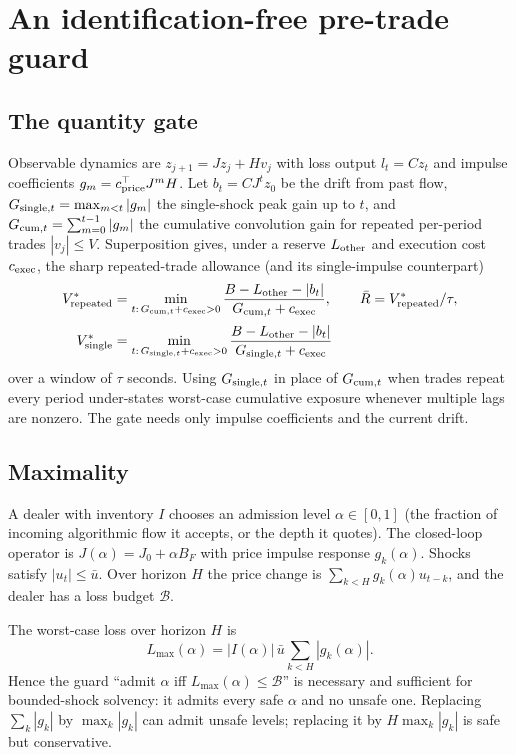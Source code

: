 \section{An identification-free pre-trade guard}\label{sec:guard}

\subsection{The quantity gate}
Observable dynamics are $z_{j+1}=Jz_j+Hv_j$ with loss output $l_t=Cz_t$ and impulse coefficients $g_m=c^\top_{\rm price}J^mH$. Let $b_t=CJ^tz_0$ be the drift from past flow, $G_{{\rm single},t}=\max_{m<t}|g_m|$ the single-shock peak gain up to $t$, and $G_{{\rm cum},t}=\sum_{m=0}^{t-1}|g_m|$ the cumulative convolution gain for repeated per-period trades $|v_j|\le V$. Superposition gives, under a reserve $L_{\rm other}$ and execution cost $c_{\rm exec}$, the sharp repeated-trade allowance (and its single-impulse counterpart)
\begin{equation}\label{eq:gate}
\begin{aligned}
V^*_{\rm repeated} &= \min_{t:\,G_{{\rm cum},t}+c_{\rm exec}>0}\frac{B-L_{\rm other}-|b_t|}{G_{{\rm cum},t}+c_{\rm exec}}, \qquad\bar R=V^*_{\rm repeated}/\tau, \\[2pt]
V^*_{\rm single} &= \min_{t:\,G_{{\rm single},t}+c_{\rm exec}>0}\frac{B-L_{\rm other}-|b_t|}{G_{{\rm single},t}+c_{\rm exec}}
\end{aligned}
\end{equation}
over a window of $\tau$ seconds. Using $G_{{\rm single},t}$ in place of $G_{{\rm cum},t}$ when trades repeat every period under-states worst-case cumulative exposure whenever multiple lags are nonzero. The gate needs only impulse coefficients and the current drift.

\subsection{Maximality}
A dealer with inventory $I$ chooses an admission level $\alpha\in[0,1]$ (the fraction of incoming algorithmic flow it accepts, or the depth it quotes). The closed-loop operator is $J(\alpha)=J_0+\alpha B_F$ with price impulse response $g_k(\alpha)$. Shocks satisfy $|u_t|\le\bar u$. Over horizon $H$ the price change is $\sum_{k<H}g_k(\alpha)u_{t-k}$, and the dealer has a loss budget $\mathcal B$.

\begin{theorem}\label{thm:guard}
The worst-case loss over horizon $H$ is
\[
L_{\max}(\alpha)=|I(\alpha)|\,\bar u\sum_{k<H}|g_k(\alpha)|.
\]
Hence the guard ``admit $\alpha$ iff $L_{\max}(\alpha)\le\mathcal B$'' is necessary and sufficient for bounded-shock solvency: it admits every safe $\alpha$ and no unsafe one. Replacing $\sum_k|g_k|$ by $\max_k|g_k|$ can admit unsafe levels; replacing it by $H\max_k|g_k|$ is safe but conservative.
\end{theorem}

